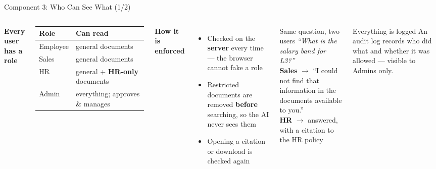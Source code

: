 \documentclass[aspectratio=169,11pt]{beamer}
\begin{document}
\begin{frame}{Component 3: Who Can See What \hfill{\normalsize\color{white}(1/2)}}
  \begin{columns}[T]
      \textbf{Every user has a role}\\[0.3em]
      \small
      \begin{tabular}{@{}ll@{}}
        \toprule
        \textbf{Role} & \textbf{Can read} \\
        \midrule
        Employee & general documents \\
        Sales & general documents \\
        HR & general + \textbf{HR-only} documents \\
        Admin & everything; approves \& manages \\
        \bottomrule
      \end{tabular}

      \vspace{0.5em}
      \textbf{How it is enforced}
      \begin{itemize}\small
        \item Checked on the \textbf{server} every time --- the browser cannot fake a role
        \item Restricted documents are removed \textbf{before} searching, so the AI never sees them
        \item Opening a citation or download is checked again
      \end{itemize}
      \begin{exampleblock}{Same question, two users}\small
        \textit{``What is the salary band for L3?''}\\[0.3em]
        \textbf{Sales} $\rightarrow$ ``I could not find that information in the documents available to you.''\\[0.2em]
        \textbf{HR} $\rightarrow$ answered, with a citation to the HR policy
      \end{exampleblock}
      \begin{block}{Everything is logged}\small
        An audit log records who did what and whether it was allowed --- visible to Admins only.
      \end{block}
  \end{columns}
\end{frame}
\end{document}
